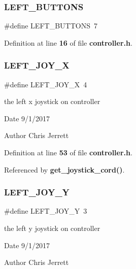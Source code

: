 \subsubsection{L\+E\+F\+T\+\_\+\+B\+U\+T\+T\+O\+NS}
{\footnotesize\ttfamily \#define L\+E\+F\+T\+\_\+\+B\+U\+T\+T\+O\+NS~7}



Definition at line \textbf{ 16} of file \textbf{ controller.\+h}.

\mbox{\label{controller_8h_ac055a23829dc64aa20b8e2e1bcfbf316}} 
\subsubsection{L\+E\+F\+T\+\_\+\+J\+O\+Y\+\_\+X}
{\footnotesize\ttfamily \#define L\+E\+F\+T\+\_\+\+J\+O\+Y\+\_\+X~4}



the left x joystick on controller 

\begin{DoxyDate}{Date}
9/1/2017 
\end{DoxyDate}
\begin{DoxyAuthor}{Author}
Chris Jerrett 
\end{DoxyAuthor}


Definition at line \textbf{ 53} of file \textbf{ controller.\+h}.



Referenced by \textbf{ get\+\_\+joystick\+\_\+cord()}.

\mbox{\label{controller_8h_ae0a2b64db5fc4f4bf4b169185be93db3}} 
\subsubsection{L\+E\+F\+T\+\_\+\+J\+O\+Y\+\_\+Y}
{\footnotesize\ttfamily \#define L\+E\+F\+T\+\_\+\+J\+O\+Y\+\_\+Y~3}



the left y joystick on controller 

\begin{DoxyDate}{Date}
9/1/2017 
\end{DoxyDate}
\begin{DoxyAuthor}{Author}
Chris Jerrett 
\end{DoxyAuthor}


